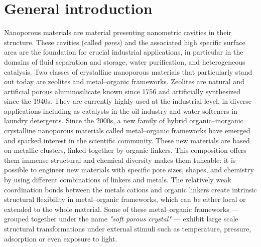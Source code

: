 
\chapter*{General introduction}

Nanoporous materials are material presenting nanometric cavities in their
structure. These cavities (called \emph{pores}) and the associated high specific
surface area are the foundation for crucial industrial applications, in
particular in the domains of fluid separation and storage, water purification,
and heterogeneous catalysis. Two classes of crystalline nanoporous materials
that particularly stand out today are zeolites and metal--organic frameworks.
Zeolites are natural and artificial porous aluminosilicate known since 1756 and
artificially synthesized since the 1940s. They are currently highly used at the
industrial level, in diverse applications including as catalysts in the oil
industry and water softeners in laundry detergents. Since the 2000s, a new
family of hybrid organic--inorganic crystalline nanoporous materials called
metal--organic frameworks have emerged and sparked interest in the scientific
community. These new materials are based on metallic clusters, linked together
by organic linkers. This composition offers them immense structural and chemical
diversity makes them tuneable: it is possible to engineer new materials with
specific pore sizes, shapes, and chemistry by using different combinations of
linkers and metals. The relatively weak coordination bonds between the metals
cations and organic linkers create intrinsic structural flexibility in
metal--organic frameworks, which can be either local or extended to the whole
material. Some of these metal--organic frameworks --- grouped together under the
name \emph{"soft porous crystal"} --- exhibit large scale structural
transformations under external stimuli such as temperature, pressure, adsorption
or even exposure to light.

